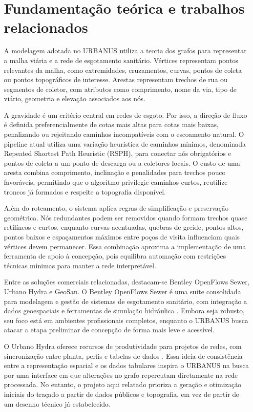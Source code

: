\documentclass[12pt,a4paper]{article}
\begin{document}
\section{Fundamentação teórica e trabalhos relacionados}

A modelagem adotada no URBANUS utiliza a teoria dos grafos para representar a malha viária e a rede de esgotamento sanitário. Vértices representam pontos relevantes da malha, como extremidades, cruzamentos, curvas, pontos de coleta ou pontos topográficos de interesse. Arestas representam trechos de rua ou segmentos de coletor, com atributos como comprimento, nome da via, tipo de viário, geometria e elevação associados aos nós.

A gravidade é um critério central em redes de esgoto. Por isso, a direção de fluxo é definida preferencialmente de cotas mais altas para cotas mais baixas, penalizando ou rejeitando caminhos incompatíveis com o escoamento natural. O pipeline atual utiliza uma variação heurística de caminhos mínimos, denominada Repeated Shortest Path Heuristic (RSPH), para conectar nós obrigatórios e pontos de coleta a um ponto de descarga ou a coletores locais. O custo de uma aresta combina comprimento, inclinação e penalidades para trechos pouco favoráveis, permitindo que o algoritmo privilegie caminhos curtos, reutilize troncos já formados e respeite a topografia disponível.

Além do roteamento, o sistema aplica regras de simplificação e preservação geométrica. Nós redundantes podem ser removidos quando formam trechos quase retilíneos e curtos, enquanto curvas acentuadas, quebras de greide, pontos altos, pontos baixos e espaçamentos máximos entre poços de visita influenciam quais vértices devem permanecer. Essa combinação aproxima a implementação de uma ferramenta de apoio à concepção, pois equilibra automação com restrições técnicas mínimas para manter a rede interpretável.


Entre as soluções comerciais relacionadas, destacam-se Bentley OpenFlows Sewer, Urbano Hydra e GeoSan. O Bentley OpenFlows Sewer é uma suíte consolidada para modelagem e gestão de sistemas de esgotamento sanitário, com integração a dados geoespaciais e ferramentas de simulação hidráulica \cite{bentley2024}. Embora seja robusto, seu foco está em ambientes profissionais completos, enquanto o URBANUS busca atacar a etapa preliminar de concepção de forma mais leve e acessível.

O Urbano Hydra oferece recursos de produtividade para projetos de redes, com sincronização entre planta, perfis e tabelas de dados \cite{peterschinegg}. Essa ideia de consistência entre a representação espacial e os dados tabulares inspira o URBANUS na busca por uma interface em que alterações no grafo repercutam diretamente na rede processada. No entanto, o projeto aqui relatado prioriza a geração e otimização iniciais do traçado a partir de dados públicos e topografia, em vez de partir de um desenho técnico já estabelecido.
\end{document}

